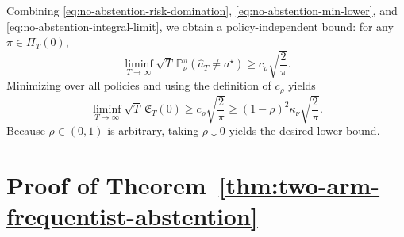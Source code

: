 \documentclass[10pt]{article}
\theoremstyle{plain}
\begin{document}
Combining \eqref{eq:no-abstention-risk-domination},
\eqref{eq:no-abstention-min-lower}, and
\eqref{eq:no-abstention-integral-limit}, we obtain a policy-independent bound: for any $\pi\in\Pi_T(0)$, %
\[
    \liminf_{T\to\infty}
    \sqrt T\,
    \mathbb P_\nu^\pi(\hat a_T\neq a^\star)
    \ge
    c_\rho\sqrt{\frac{2}{\pi}} .
\]
Minimizing over all policies and using the definition of $c_\rho$ yields
\[
    \liminf_{T\to\infty}
    \sqrt T\,
    \mathfrak E_{T}(0)
    \ge
    c_\rho\sqrt{\frac{2}{\pi}} 
    \ge
    (1-\rho)^2\kappa_\nu\sqrt{\frac{2}{\pi}}.
\]
Because $\rho\in(0,1)$ is arbitrary, taking $\rho\downarrow0$ yields the desired lower bound.  



















\section{Proof of Theorem~\ref{thm:two-arm-frequentist-abstention}}
\label{app:frequentist-abstention}
\end{document}
